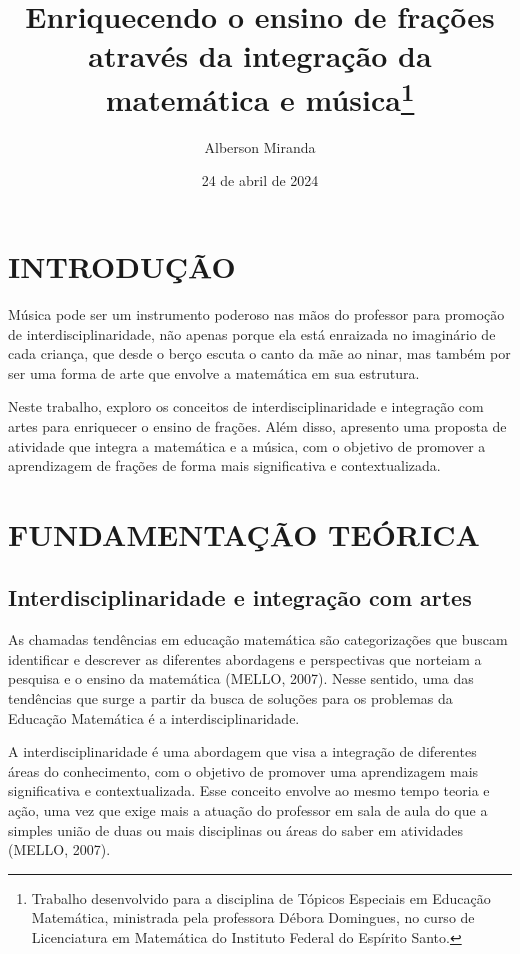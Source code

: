 \documentclass[
  letterpaper,
  DIV=11,
  numbers=noendperiod]{scrreprt}
\title{Enriquecendo o ensino de frações através da integração da
matemática e música\thanks{Trabalho desenvolvido para a disciplina de
Tópicos Especiais em Educação Matemática, ministrada pela professora
Débora Domingues, no curso de Licenciatura em Matemática do Instituto
Federal do Espírito Santo.}}
\author{Alberson Miranda}
\date{24 de abril de 2024}
\renewcommand*\contentsname{Índice}
\newcommand\contentsname{Índice}
\begin{document}
\maketitle

\renewcommand*\contentsname{Índice}
{
\hypersetup{linkcolor=}
\setcounter{tocdepth}{2}
\tableofcontents
}
\chapter{INTRODUÇÃO}\label{introduuxe7uxe3o}

Música pode ser um instrumento poderoso nas mãos do professor para
promoção de interdisciplinaridade, não apenas porque ela está enraizada
no imaginário de cada criança, que desde o berço escuta o canto da mãe
ao ninar, mas também por ser uma forma de arte que envolve a matemática
em sua estrutura.

Neste trabalho, exploro os conceitos de interdisciplinaridade e
integração com artes para enriquecer o ensino de frações. Além disso,
apresento uma proposta de atividade que integra a matemática e a música,
com o objetivo de promover a aprendizagem de frações de forma mais
significativa e contextualizada.

\chapter{FUNDAMENTAÇÃO TEÓRICA}\label{fundamentauxe7uxe3o-teuxf3rica}

\section{Interdisciplinaridade e integração com
artes}\label{interdisciplinaridade-e-integrauxe7uxe3o-com-artes}

As chamadas tendências em educação matemática são categorizações que
buscam identificar e descrever as diferentes abordagens e perspectivas
que norteiam a pesquisa e o ensino da matemática (MELLO, 2007). Nesse
sentido, uma das tendências que surge a partir da busca de soluções para
os problemas da Educação Matemática é a interdisciplinaridade.

A interdisciplinaridade é uma abordagem que visa a integração de
diferentes áreas do conhecimento, com o objetivo de promover uma
aprendizagem mais significativa e contextualizada. Esse conceito envolve
ao mesmo tempo teoria e ação, uma vez que exige mais a atuação do
professor em sala de aula do que a simples união de duas ou mais
disciplinas ou áreas do saber em atividades (MELLO, 2007).
\end{document}
